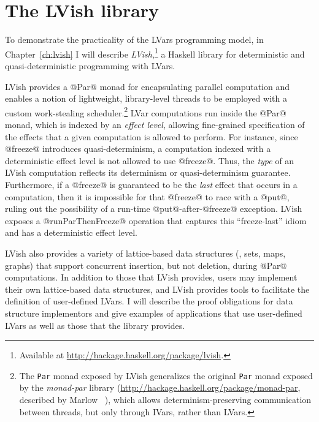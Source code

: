 \section{The LVish library}\label{s:intro-lvish}

To demonstrate the practicality of the LVars programming model, in
Chapter~\ref{ch:lvish} I will describe
\emph{LVish},\footnote{Available at
  \url{http://hackage.haskell.org/package/lvish}.} a Haskell library
for deterministic and quasi-deterministic programming with LVars.

LVish provides a @Par@ monad for encapsulating parallel computation
and enables a notion of lightweight, library-level threads to be
employed with a custom work-stealing scheduler.\footnote{The
  \lstinline|Par| monad exposed by LVish generalizes the original
  \lstinline|Par| monad exposed by the \emph{monad-par} library
  ({\url{http://hackage.haskell.org/package/monad-par}}, described by
  Marlow \etal~\cite{monad-par}), which allows determinism-preserving
  communication between threads, but only through IVars, rather than
  LVars.}  LVar computations run inside the @Par@ monad, which is
indexed by an \emph{effect level}, allowing fine-grained specification
of the effects that a given computation is allowed to perform.  For
instance, since @freeze@ introduces quasi-determinism, a computation
indexed with a deterministic effect level is not allowed to use
@freeze@.  Thus, the \emph{type} of an LVish computation reflects its
determinism or quasi-determinism guarantee.  Furthermore, if a
@freeze@ is guaranteed to be the \emph{last} effect that occurs in a
computation, then it is impossible for that @freeze@ to race with a
@put@, ruling out the possibility of a run-time @put@-after-@freeze@
exception.  LVish exposes a @runParThenFreeze@ operation that captures
this ``freeze-last'' idiom and has a deterministic effect level.

LVish also provides a variety of lattice-based data structures (\eg,
sets, maps, graphs) that support concurrent insertion, but not
deletion, during @Par@ computations.  In addition to those that LVish
provides, users may implement their own lattice-based data structures,
and LVish provides tools to facilitate the definition of user-defined
LVars.  I will describe the proof obligations for data structure
implementors and give examples of applications that use user-defined
LVars as well as those that the library provides.


